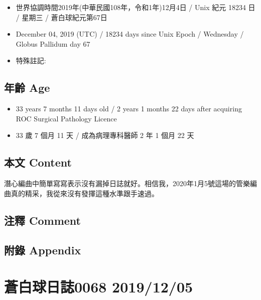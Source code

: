 \documentclass[a5paper, 12pt
]{book}
\providecommand{\tightlist}{%
  \setlength{\itemsep}{0pt}\setlength{\parskip}{0pt}}
\begin{document}
\begin{itemize}
\tightlist
\item
  世界協調時間2019年(中華民國108年，令和1年)12月4日 / Unix 紀元 18234 日
  / 星期三 / 蒼白球紀元第67日
\item
  December 04, 2019 (UTC) / 18234 days since Unix Epoch / Wednesday /
  Globus Pallidum day 67
\item
  特殊註記:
\end{itemize}

\hypertarget{ux5e74ux9f61-age-3}{%
\subsection{年齡 Age}\label{ux5e74ux9f61-age-3}}

\begin{itemize}
\tightlist
\item
  33 years 7 months 11 days old / 2 years 1 months 22 days after
  acquiring ROC Surgical Pathology Licence
\item
  33 歲 7 個月 11 天 / 成為病理專科醫師 2 年 1 個月 22 天
\end{itemize}

\hypertarget{ux672cux6587-content-3}{%
\subsection{本文 Content}\label{ux672cux6587-content-3}}

潛心編曲中簡單寫寫表示沒有漏掉日誌就好。相信我，2020年1月5號這場的管樂編曲真的精采，我從來沒有發揮這種水準跟手速過。

\hypertarget{ux6ce8ux91cb-comment-3}{%
\subsection{注釋 Comment}\label{ux6ce8ux91cb-comment-3}}

\hypertarget{ux9644ux9304-appendix-3}{%
\subsection{附錄 Appendix}\label{ux9644ux9304-appendix-3}}

\hypertarget{ux84bcux767dux7403ux65e5ux8a8c0068-20191205}{%
\section{蒼白球日誌0068
2019/12/05}\label{ux84bcux767dux7403ux65e5ux8a8c0068-20191205}}
\end{document}
